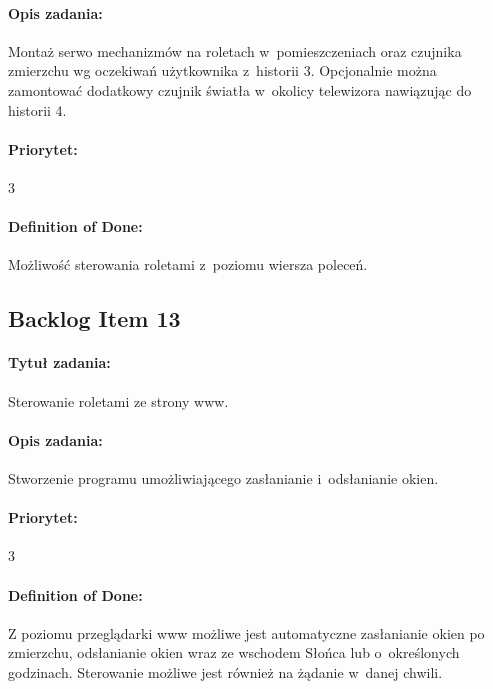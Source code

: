 	\paragraph{Opis zadania:} 
	Montaż serwo mechanizmów na roletach w~pomieszczeniach oraz czujnika zmierzchu wg oczekiwań użytkownika z~historii 3. Opcjonalnie można zamontować dodatkowy czujnik światła w~okolicy telewizora nawiązując do historii 4.
	
	\paragraph{Priorytet:}
	3
	
	\paragraph{Definition of Done:}
	Możliwość sterowania roletami z~poziomu wiersza poleceń.



	\subsection{Backlog Item 13}
	\paragraph{Tytuł zadania:}
	Sterowanie roletami ze strony www.
	
	\paragraph{Opis zadania:} 
	Stworzenie programu umożliwiającego zasłanianie i~odsłanianie okien.
	
	\paragraph{Priorytet:}
	3
	
	\paragraph{Definition of Done:}
	Z poziomu przeglądarki www możliwe jest automatyczne zasłanianie okien po zmierzchu, odsłanianie okien wraz ze wschodem Słońca lub o~określonych godzinach. Sterowanie możliwe jest również na żądanie w~danej chwili.


	
